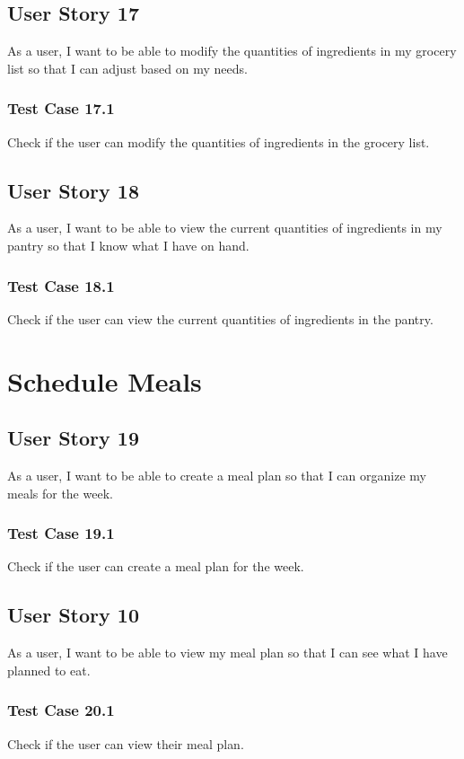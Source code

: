 \documentclass[11pt, letterpaper]{report}
\begin{document}
\subsection{User Story 17}
As a user, I want to be able to modify the quantities of ingredients in my grocery list so that I can adjust based on my needs.

\subsubsection{Test Case 17.1}
Check if the user can modify the quantities of ingredients in the grocery list.

\subsection{User Story 18}
As a user, I want to be able to view the current quantities of ingredients in my pantry so that I know what I have on hand.

\subsubsection{Test Case 18.1}
Check if the user can view the current quantities of ingredients in the pantry.

\section{Schedule Meals}

\subsection{User Story 19}
As a user, I want to be able to create a meal plan so that I can organize my meals for the week.

\subsubsection{Test Case 19.1}
Check if the user can create a meal plan for the week.

\subsection{User Story 10}
As a user, I want to be able to view my meal plan so that I can see what I have planned to eat.

\subsubsection{Test Case 20.1}
Check if the user can view their meal plan.
\end{document}
